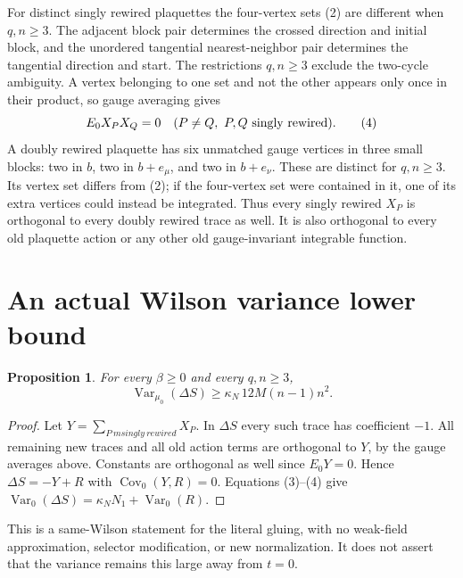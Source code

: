 \documentclass{article}
\newtheorem{proposition}{Proposition}
\begin{document}
For distinct singly rewired plaquettes the four-vertex sets (2) are different when $q,n\geq3$. The adjacent block pair determines the crossed direction and initial block, and the unordered tangential nearest-neighbor pair determines the tangential direction and start. The restrictions $q,n\geq3$ exclude the two-cycle ambiguity. A vertex belonging to one set and not the other appears only once in their product, so gauge averaging gives
\[
 E_0X_PX_Q=0\quad(P\ne Q,\ P,Q\hbox{ singly rewired}).
 \tag{4}
\]
A doubly rewired plaquette has six unmatched gauge vertices in three small blocks: two in $b$, two in $b+e_\mu$, and two in $b+e_\nu$. These are distinct for $q,n\geq3$. Its vertex set differs from (2); if the four-vertex set were contained in it, one of its extra vertices could instead be integrated. Thus every singly rewired $X_P$ is orthogonal to every doubly rewired trace as well. It is also orthogonal to every old plaquette action or any other old gauge-invariant integrable function.

\section{An actual Wilson variance lower bound}
\begin{proposition}
For every $\beta\geq0$ and every $q,n\geq3$,
\[
 \operatorname{Var}_{\mu_0}(\Delta S)\geq
 \kappa_N\,12M(n-1)n^2.
 \tag{5}
\]
\end{proposition}
\begin{proof}
Let $Y=\sum_{P\ {
m singly\ rewired}}X_P$. In $\Delta S$ every such trace has coefficient $-1$. All remaining new traces and all old action terms are orthogonal to $Y$, by the gauge averages above. Constants are orthogonal as well since $E_0Y=0$. Hence $\Delta S=-Y+R$ with $\operatorname{Cov}_0(Y,R)=0$. Equations (3)--(4) give
$\operatorname{Var}_0(\Delta S)=\kappa_NN_1+\operatorname{Var}_0(R)$.
\end{proof}
This is a same-Wilson statement for the literal gluing, with no weak-field approximation, selector modification, or new normalization. It does not assert that the variance remains this large away from $t=0$.
\end{document}

